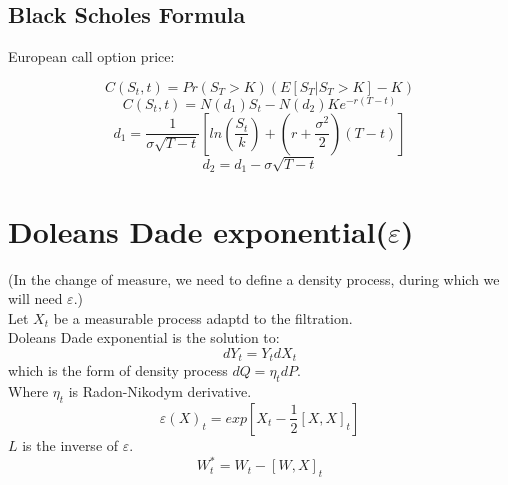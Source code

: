 \documentclass[12pt]{article}
\begin{document}
\subsection{Black Scholes Formula}


European call option price:

$$C(S_t,t)=Pr(S_T>K)(E[S_T|S_T>K]-K)$$
$$C(S_t,t)=N(d_1)S_t-N(d_2)Ke^{-r(T-t)}$$
$$d_1=\frac{1}{\sigma\sqrt{T-t}}[ln(\frac{S_t}{k}) + (r+\frac{\sigma^2}{2})(T-t)]$$
$$d_2=d_1-\sigma\sqrt{T-t}$$



\section{Doleans Dade exponential($\varepsilon$)}
(In the change of measure, we need to define a density process, during which we will need $\varepsilon$.)\\
Let $X_t$ be a measurable process adaptd to the filtration.\\
Doleans Dade exponential is the solution to:
$$dY_t=Y_tdX_t$$
which is the form of density process $dQ=\eta_tdP$.\\
Where $\eta_t$ is Radon-Nikodym derivative.
$$\varepsilon(X)_t=exp[X_t-\frac{1}{2}[X,X]_t]$$
$L$ is the inverse of $\varepsilon$.\\
$$W_t^*=W_t-[W,X]_t$$\\
\end{document}
